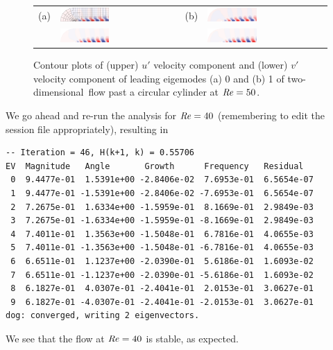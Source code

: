 \documentclass[11pt,a4paper]{report}
\newcommand\Rey{\mbox{\textit{Re}}}
\newcommand\twod{two-di\-men\-sion\-al}
\begin{document}
\begin{figure}
\begin{center}
\begin{tabular}{llll}
(a) &
\includegraphics[width=0.425\textwidth]{Re50_eig0_u_mesh.pdf} &
(b) &
\includegraphics[width=0.425\textwidth]{Re50_eig1_u.pdf} \\
&
\includegraphics[width=0.425\textwidth]{Re50_eig0_v.pdf} &
&
\includegraphics[width=0.425\textwidth]{Re50_eig1_v.pdf}
\end{tabular}
\end{center}
\caption{Contour plots of (upper) $u'$ velocity component and (lower)
  $v'$ velocity component of leading eigemodes (a) 0 and (b) 1 of
  \twod\ flow past a circular cylinder at $\Rey=50$.}
\label{fig.semimodes}
\end{figure}

We go ahead and re-run the analysis for $\Rey=40$ (remembering to edit
the session file appropriately), resulting in
{\small
\begin{verbatim}
-- Iteration = 46, H(k+1, k) = 0.55706
EV  Magnitude   Angle       Growth      Frequency   Residual
 0  9.4477e-01  1.5391e+00 -2.8406e-02  7.6953e-01  6.5654e-07
 1  9.4477e-01 -1.5391e+00 -2.8406e-02 -7.6953e-01  6.5654e-07
 2  7.2675e-01  1.6334e+00 -1.5959e-01  8.1669e-01  2.9849e-03
 3  7.2675e-01 -1.6334e+00 -1.5959e-01 -8.1669e-01  2.9849e-03
 4  7.4011e-01  1.3563e+00 -1.5048e-01  6.7816e-01  4.0655e-03
 5  7.4011e-01 -1.3563e+00 -1.5048e-01 -6.7816e-01  4.0655e-03
 6  6.6511e-01  1.1237e+00 -2.0390e-01  5.6186e-01  1.6093e-02
 7  6.6511e-01 -1.1237e+00 -2.0390e-01 -5.6186e-01  1.6093e-02
 8  6.1827e-01  4.0307e-01 -2.4041e-01  2.0153e-01  3.0627e-01
 9  6.1827e-01 -4.0307e-01 -2.4041e-01 -2.0153e-01  3.0627e-01
dog: converged, writing 2 eigenvectors.
\end{verbatim}
}
\noindent
We see that the flow at $\Rey=40$ is stable, as expected.
\end{document}

